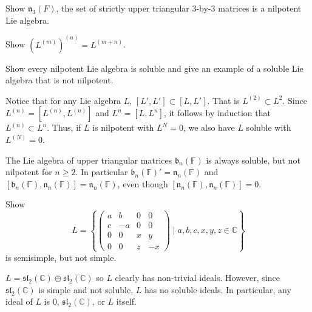 \documentclass[12 pt, letterpaper]{hmcpset}
\begin{document}
\begin{problem}[1]
	Show $\mathfrak{n}_{3}(F)$, the set of strictly upper triangular $3$-by-$3$ matrices is a nilpotent Lie algebra.
\end{problem}

\pagebreak

\begin{problem}[2]
	Show $(L^{(m)})^{(n)} = L^{(m + n)}$.
\end{problem}

\pagebreak

\begin{problem}[3]
	Show every nilpotent Lie algebra is soluble and give an example of a soluble Lie algebra that is not nilpotent.
\end{problem}

\begin{solution}
	 Notice that for any Lie algebra $L$, $[L', L'] \subset [L, L']$. That is $L^{{(2)}} \subset L^{2}$. Since $L^{(n)} = [L^{(n)}, L^{(n)}]$ and $L^{n} = [L, L^{n}]$, it follows by induction that $L^{(n)} \subset L^{n}$. Thus, if $L$ is nilpotent with $L^{N} = 0$, we also have $L$ soluble with $L^{(N)} = 0$.

	 The Lie algebra of upper triangular matrices $\mathfrak{b}_{n}(\mathbb{F})$ is always soluble, but not nilpotent for $n \ge 2$. In particular $\mathfrak{b}_{n}(\mathbb{F})' = \mathfrak{n}_{n}(\mathbb{F})$ and $[\mathfrak{b}_{n}(\mathbb{F}), \mathfrak{n}_{n}(\mathbb{F})] = \mathfrak{n}_{n}(\mathbb{F})$, even though $[\mathfrak{n}_{n}(\mathbb{F}), \mathfrak{n}_{n}(\mathbb{F})] = 0$.
\end{solution}

\pagebreak

\begin{problem}[4]
	Show
	\[
		L = \left \{ \begin{pmatrix}
				a & b & 0 & 0 \\
				c & -a & 0 & 0 \\
				0 & 0 & x & y \\
				0 & 0 & z & -x
		\end{pmatrix} \mid a, b, c, x, y, z \in \mathbb{C} \right \}
	\]
	is semisimple, but not simple.
\end{problem}

\begin{solution}
	$L = \mathfrak{sl}_{2}(\mathbb{C}) \oplus \mathfrak{sl}_{2}(\mathbb{C})$ so $L$ clearly has non-trivial ideals. However, since $\mathfrak{sl}_{2}(\mathbb{C})$ is simple and not soluble, $L$ has no soluble ideals. In particular, any ideal of $L$ is $0$, $\mathfrak{sl}_{2}(\mathbb{C})$, or $L$ itself.
\end{solution}
\end{document}
